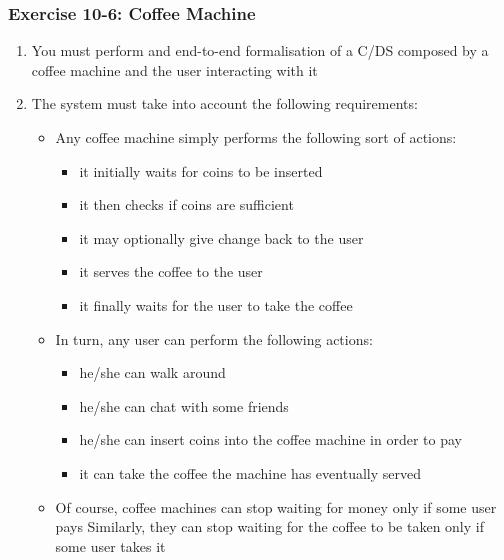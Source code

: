 \documentclass[presentation]{beamer}\mode<presentation>{\usetheme{AMSCesenaPurpleAndGold}}
\begin{document}
\begin{frame}[allowframebreaks]
\frametitle{Exercise 10-6: Coffee Machine}
    
    \begin{enumerate}
        \item You must perform and end-to-end formalisation of a C/DS composed by a coffee machine and the user interacting with it
        
        \item The system must take into account the following requirements:
        \begin{itemize}
            
            \item Any coffee machine simply performs the following sort of actions:
            \begin{itemize}
                \item it initially \alert{waits} for \alert{coins} to be inserted
                \item it then \alert{checks} if coins are sufficient
                \item it may optionally give \alert{change} back to the user
                \item it serves the \alert{coffee} to the user
                \item it finally \alert{waits} for the \alert{user} to take the coffee 
            \end{itemize}
            
            \item In turn, any user can perform the following actions:
            \begin{itemize}
                \item he/she can \alert{walk} around
                \item he/she can \alert{chat} with some friends
                \item he/she can insert coins into the coffee machine in order to \alert{pay}
                \item it can \alert{take} the coffee the machine has eventually served
            \end{itemize}
            
            \item Of course, coffee machines can stop waiting for money only if some user pays 
            Similarly, they can stop waiting for the coffee to be taken only if some user takes it
        \end{itemize}
        

\end{enumerate}
\end{frame}
\end{document}
